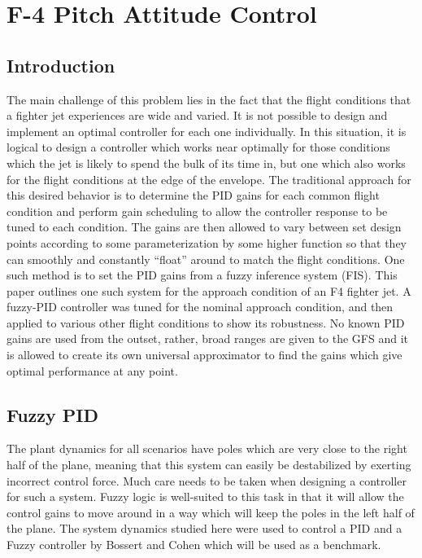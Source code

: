 \chapter{F-4 Pitch Attitude Control}\label{c:f4}
\section{Introduction} The main challenge of this problem lies in the fact that the flight conditions that a
fighter jet experiences are wide and varied. It is not possible to design and implement an optimal
controller for each one individually. In this situation, it is logical to design a controller which works near
optimally for those conditions which the jet is likely to spend the bulk of its time in, but one which also
works for the flight conditions at the edge of the envelope. The traditional approach for this desired
behavior is to determine the PID gains for each common flight condition and perform gain scheduling to allow
the controller response to be tuned to each condition. The gains are then allowed to vary between set design
points according to some parameterization by some higher function so that they can smoothly and constantly
``float'' around to match the flight conditions. One such method is to set the PID gains from a fuzzy
inference system (FIS). This paper outlines one such system for the approach condition of an F4 fighter jet. A
fuzzy-PID controller was tuned for the nominal approach condition, and then applied to various other flight
conditions to show its robustness. No known PID gains are used from the outset, rather, broad ranges are given
to the GFS and it is allowed to create its own universal approximator to find the gains which give optimal
performance at any point.

\section{Fuzzy PID} The plant dynamics for all scenarios have poles which are very close to the
right half of the plane, meaning that this system can easily be destabilized by exerting incorrect control
force. Much care needs to be taken when designing a controller for such a system. Fuzzy logic is well-suited
to this task in that it will allow the control gains to move around in a way which will keep the poles in the
left half of the plane. The system dynamics studied here were used to control a PID and a Fuzzy controller by
Bossert and Cohen\cite{bossert2002pid} which will be used as a benchmark.


